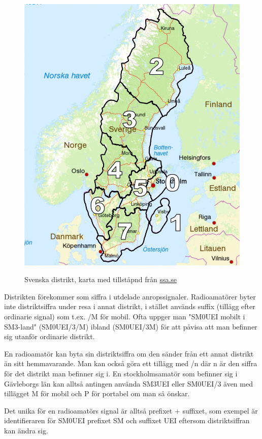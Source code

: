 \begin{figure}
	\centering
	\includegraphics[width=15cm]{pic/sm-distrikt-stor}
	\label{fig:sm-distrikt}
	\caption{Svenska distrikt, karta med tillståpnd från \href{https://SSA.SE}{ssa.se}}
\end{figure}

Distrikten förekommer som siffra i utdelade anropssignaler. Radioamatörer 
byter inte distriktsiffra under resa i annat distrikt, i stället används 
suffix (tillägg efter ordinarie signal) som t.ex. /M för mobil. Ofta uppger 
man "SM0UEI mobilt i SM3-land" (SM0UEI/3/M) ibland (SM0UEI/3M) för att 
påvisa att man befinner sig utanför ordinarie distrikt.

En radioamatör kan byta sin distriktsiffra om den sänder från ett
annat distrikt än sitt hemmavarande. Man kan också göra ett tillägg
med /n där n är den siffra för det distrikt man befinner sig i. En
stockholmsamatör som befinner sig i Gävleborgs län kan alltså antingen
använda SM3UEI eller SM0UEI/3 även med tillägget M för mobil och P för
portabel om man så önskar.

Det unika för en radioamatörs signal är alltså prefixet + suffixet,
som exempel är identifieraren för SM0UEI prefixet SM och suffixet UEI
eftersom distriktsiffran kan ändra sig. 

